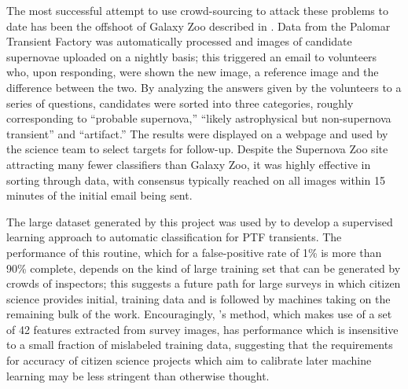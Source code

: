 \documentclass{ar2e}
\begin{document}
The most successful attempt to use crowd-sourcing to attack these problems to
date has been the offshoot of Galaxy Zoo described in \citet{SmithSN}.  Data
from the Palomar Transient Factory \citep{LawPTF} was automatically processed
and images of candidate supernovae uploaded on a nightly basis; this triggered
an email to volunteers who, upon responding, were shown the new image, a
reference image and the difference between the two. By analyzing the answers
given by the volunteers to a series of questions, candidates were sorted into 
three categories, roughly corresponding to ``probable supernova,'' ``likely
astrophysical but non-supernova transient'' and ``artifact.'' The results were
displayed on a webpage and used by the science team to select targets for
follow-up. Despite the Supernova Zoo site attracting many fewer classifiers 
than Galaxy Zoo, it was highly effective in sorting through data,  with
consensus typically reached on all images within 15 minutes of the initial email
being sent. 

The large dataset generated by this project was used by \citet{Brink} to develop
a supervised learning approach to automatic classification for PTF transients.
The performance of this routine, which for a false-positive rate of 1\% is more
than 90\% complete, depends on the kind of large training set that can be
generated by crowds of inspectors; this suggests a future path for large surveys
in which citizen science provides initial, training data and is followed by
machines taking on the remaining bulk of the work. Encouragingly,
\citeauthor{Brink}'s method, which makes use of a set of 42 features extracted
from survey images, has performance which is insensitive to a small fraction of
mislabeled training data, suggesting that the requirements for accuracy of
citizen science projects which aim to calibrate later machine learning may be
less stringent than otherwise thought. 
\end{document}
